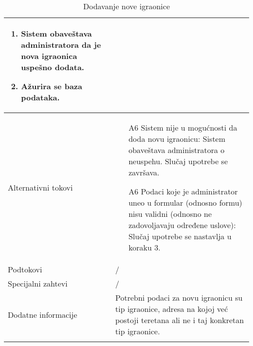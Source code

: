 \documentclass[../main.tex]{subfiles}
\begin{document}
\begin{longtable}{| p{} | p{} |}
\begin{enumerate}
        \item Sistem obaveštava administratora da je nova igraonica uspešno dodata. %
        \item Ažurira se baza podataka.
    \end{enumerate}\\
\hline
    Alternativni tokovi & \begin{itemize}
        \item[A6]  Sistem nije u mogućnosti da doda novu igraonicu: Sistem obaveštava administratora o neuspehu. Slučaj upotrebe se završava.
        \item[A6]  Podaci koje je administrator uneo u formular (odnosno formu) nisu validni (odnosno ne zadovoljavaju određene uslove): Slučaj upotrebe se nastavlja u koraku 3.
    \end{itemize}\\
\hline
    Podtokovi & /\\
\hline
    Specijalni zahtevi & /\\
\hline
    Dodatne informacije & Potrebni podaci za novu igraonicu su tip igraonice, adresa na kojoj već postoji teretana ali ne i taj konkretan tip igraonice.
    \\
\hline
\caption{Dodavanje nove igraonice} %
\end{longtable}
\end{document}
